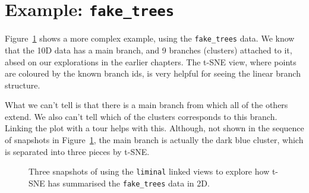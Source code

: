 \documentclass[
  letterpaper,
]{book}
\newenvironment{Shaded}{\begin{snugshade}}{\end{snugshade}}
\newcommand{\AttributeTok}[1]{\textcolor[rgb]{0.40,0.45,0.13}{#1}}
\newcommand{\DecValTok}[1]{\textcolor[rgb]{0.68,0.00,0.00}{#1}}
\newcommand{\FunctionTok}[1]{\textcolor[rgb]{0.28,0.35,0.67}{#1}}
\newcommand{\NormalTok}[1]{\textcolor[rgb]{0.00,0.23,0.31}{#1}}
\newcommand{\OtherTok}[1]{\textcolor[rgb]{0.00,0.23,0.31}{#1}}
\newcommand{\SpecialCharTok}[1]{\textcolor[rgb]{0.37,0.37,0.37}{#1}}
\newcommand{\StringTok}[1]{\textcolor[rgb]{0.13,0.47,0.30}{#1}}
\begin{document}
\hypertarget{example-fake_trees}{%
\section{\texorpdfstring{Example:
\texttt{fake\_trees}}{Example: fake\_trees}}\label{example-fake_trees}}

Figure~\ref{fig-liminal-trees} shows a more complex example, using the
\texttt{fake\_trees} data. We know that the 10D data has a main branch,
and 9 branches (clusters) attached to it, absed on our explorations in
the earlier chapters. The t-SNE view, where points are coloured by the
known branch ids, is very helpful for seeing the linear branch
structure.

What we can't tell is that there is a main branch from which all of the
others extend. We also can't tell which of the clusters corresponds to
this branch. Linking the plot with a tour helps with this. Although, not
shown in the sequence of snapshots in Figure~\ref{fig-liminal-trees},
the main branch is actually the dark blue cluster, which is separated
into three pieces by t-SNE.

\begin{Shaded}
\end{Shaded}

\begin{figure}

{\centering 

}

\caption{\label{fig-liminal-trees}Three snapshots of using the
\texttt{liminal} linked views to explore how t-SNE has summarised the
\texttt{fake\_trees} data in 2D.}

\end{figure}
\end{document}
